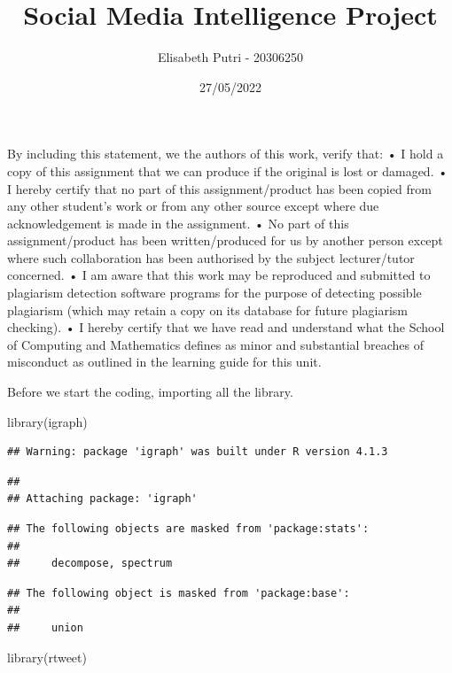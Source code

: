 \documentclass[
]{article}
\title{Social Media Intelligence Project}
\author{Elisabeth Putri - 20306250}
\date{27/05/2022}
\newenvironment{Shaded}{\begin{snugshade}}{\end{snugshade}}
\newcommand{\FunctionTok}[1]{\textcolor[rgb]{0.00,0.00,0.00}{#1}}
\newcommand{\NormalTok}[1]{#1}
\newcommand{\StringTok}[1]{\textcolor[rgb]{0.31,0.60,0.02}{#1}}
\begin{document}
\maketitle

By including this statement, we the authors of this work, verify that: •
I hold a copy of this assignment that we can produce if the original is
lost or damaged. • I hereby certify that no part of this
assignment/product has been copied from any other student's work or from
any other source except where due acknowledgement is made in the
assignment. • No part of this assignment/product has been
written/produced for us by another person except where such
collaboration has been authorised by the subject lecturer/tutor
concerned. • I am aware that this work may be reproduced and submitted
to plagiarism detection software programs for the purpose of detecting
possible plagiarism (which may retain a copy on its database for future
plagiarism checking). • I hereby certify that we have read and
understand what the School of Computing and Mathematics defines as minor
and substantial breaches of misconduct as outlined in the learning guide
for this unit.

Before we start the coding, importing all the library.

\begin{Shaded}
\begin{Highlighting}[]
\FunctionTok{library}\NormalTok{(}\StringTok{\textquotesingle{}igraph\textquotesingle{}}\NormalTok{)}
\end{Highlighting}
\end{Shaded}

\begin{verbatim}
## Warning: package 'igraph' was built under R version 4.1.3
\end{verbatim}

\begin{verbatim}
## 
## Attaching package: 'igraph'
\end{verbatim}

\begin{verbatim}
## The following objects are masked from 'package:stats':
## 
##     decompose, spectrum
\end{verbatim}

\begin{verbatim}
## The following object is masked from 'package:base':
## 
##     union
\end{verbatim}

\begin{Shaded}
\begin{Highlighting}[]
\FunctionTok{library}\NormalTok{(}\StringTok{\textquotesingle{}rtweet\textquotesingle{}}\NormalTok{)}
\end{Highlighting}
\end{Shaded}
\end{document}
